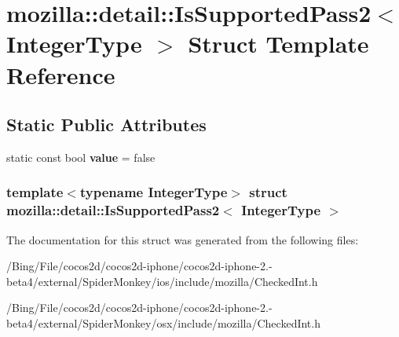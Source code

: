 \hypertarget{structmozilla_1_1detail_1_1_is_supported_pass2}{\section{mozilla\-:\-:detail\-:\-:Is\-Supported\-Pass2$<$ Integer\-Type $>$ Struct Template Reference}
\label{structmozilla_1_1detail_1_1_is_supported_pass2}
}
\subsection*{Static Public Attributes}
\begin{DoxyCompactItemize}
\item 
\hypertarget{structmozilla_1_1detail_1_1_is_supported_pass2_a9dcc5718d7e2f32f254beecda55f7f9b}{static const bool {\bfseries value} = false}\label{structmozilla_1_1detail_1_1_is_supported_pass2_a9dcc5718d7e2f32f254beecda55f7f9b}

\end{DoxyCompactItemize}
\subsubsection*{template$<$typename Integer\-Type$>$ struct mozilla\-::detail\-::\-Is\-Supported\-Pass2$<$ Integer\-Type $>$}



The documentation for this struct was generated from the following files\-:\begin{DoxyCompactItemize}
\item 
/\-Bing/\-File/cocos2d/cocos2d-\/iphone/cocos2d-\/iphone-\/2.-\/beta4/external/\-Spider\-Monkey/ios/include/mozilla/Checked\-Int.\-h\item 
/\-Bing/\-File/cocos2d/cocos2d-\/iphone/cocos2d-\/iphone-\/2.-\/beta4/external/\-Spider\-Monkey/osx/include/mozilla/Checked\-Int.\-h\end{DoxyCompactItemize}
